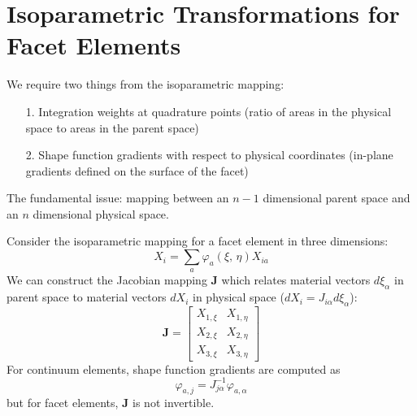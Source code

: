 \documentclass[11pt]{article} %
\begin{document}
\section{Isoparametric Transformations for Facet Elements}

We require two things from the isoparametric mapping:
\begin{itemize}
	\item[1.] Integration weights at quadrature points (ratio of areas in the physical space to areas in the parent space)
	\item[2.] Shape function gradients with respect to physical coordinates (in-plane gradients defined on the surface of the facet)
\end{itemize}

The fundamental issue: mapping between an $n-1$ dimensional parent space and an $n$ dimensional physical space.

Consider the isoparametric mapping for a facet element in three dimensions:
\begin{equation}
	X_i = \sum_a \varphi_a (\xi, \, \eta) X_{ia}
\end{equation}
We can construct the Jacobian mapping $\mathbf{J}$ which relates material vectors $d \xi_{\alpha}$ in parent space to material vectors $d X_i$ in physical space ($d X_i = J_{i \alpha} d \xi_{\alpha}$):
\begin{equation}
	\mathbf{J} = \left[ \begin{array}{cc} X_{1,\xi} & X_{1,\eta} \\ X_{2,\xi} & X_{2,\eta} \\ X_{3,\xi} & X_{3,\eta} \end{array} \right]
\end{equation}
For continuum elements, shape function gradients are computed as
\begin{equation}
	\varphi_{a,j} = J^{-1}_{j \alpha} \varphi_{a,\alpha}
\end{equation}
but for facet elements, $\mathbf{J}$ is not invertible.
\end{document}
